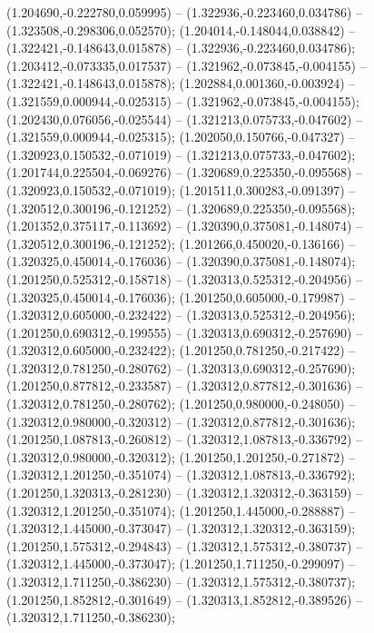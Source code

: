  (1.204690,-0.222780,0.059995) -- (1.322936,-0.223460,0.034786) -- (1.323508,-0.298306,0.052570);
 (1.204014,-0.148044,0.038842) -- (1.322421,-0.148643,0.015878) -- (1.322936,-0.223460,0.034786);
 (1.203412,-0.073335,0.017537) -- (1.321962,-0.073845,-0.004155) -- (1.322421,-0.148643,0.015878);
 (1.202884,0.001360,-0.003924) -- (1.321559,0.000944,-0.025315) -- (1.321962,-0.073845,-0.004155);
 (1.202430,0.076056,-0.025544) -- (1.321213,0.075733,-0.047602) -- (1.321559,0.000944,-0.025315);
 (1.202050,0.150766,-0.047327) -- (1.320923,0.150532,-0.071019) -- (1.321213,0.075733,-0.047602);
 (1.201744,0.225504,-0.069276) -- (1.320689,0.225350,-0.095568) -- (1.320923,0.150532,-0.071019);
 (1.201511,0.300283,-0.091397) -- (1.320512,0.300196,-0.121252) -- (1.320689,0.225350,-0.095568);
 (1.201352,0.375117,-0.113692) -- (1.320390,0.375081,-0.148074) -- (1.320512,0.300196,-0.121252);
 (1.201266,0.450020,-0.136166) -- (1.320325,0.450014,-0.176036) -- (1.320390,0.375081,-0.148074);
 (1.201250,0.525312,-0.158718) -- (1.320313,0.525312,-0.204956) -- (1.320325,0.450014,-0.176036);
 (1.201250,0.605000,-0.179987) -- (1.320312,0.605000,-0.232422) -- (1.320313,0.525312,-0.204956);
 (1.201250,0.690312,-0.199555) -- (1.320313,0.690312,-0.257690) -- (1.320312,0.605000,-0.232422);
 (1.201250,0.781250,-0.217422) -- (1.320312,0.781250,-0.280762) -- (1.320313,0.690312,-0.257690);
 (1.201250,0.877812,-0.233587) -- (1.320312,0.877812,-0.301636) -- (1.320312,0.781250,-0.280762);
 (1.201250,0.980000,-0.248050) -- (1.320312,0.980000,-0.320312) -- (1.320312,0.877812,-0.301636);
 (1.201250,1.087813,-0.260812) -- (1.320312,1.087813,-0.336792) -- (1.320312,0.980000,-0.320312);
 (1.201250,1.201250,-0.271872) -- (1.320312,1.201250,-0.351074) -- (1.320312,1.087813,-0.336792);
 (1.201250,1.320313,-0.281230) -- (1.320312,1.320312,-0.363159) -- (1.320312,1.201250,-0.351074);
 (1.201250,1.445000,-0.288887) -- (1.320312,1.445000,-0.373047) -- (1.320312,1.320312,-0.363159);
 (1.201250,1.575312,-0.294843) -- (1.320312,1.575312,-0.380737) -- (1.320312,1.445000,-0.373047);
 (1.201250,1.711250,-0.299097) -- (1.320312,1.711250,-0.386230) -- (1.320312,1.575312,-0.380737);
 (1.201250,1.852812,-0.301649) -- (1.320313,1.852812,-0.389526) -- (1.320312,1.711250,-0.386230);
